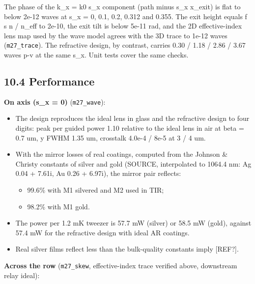 The phase of the k\_x = k0 s\_x component (path minus s\_x x\_exit) is
flat to below 2e-12 waves at s\_x = 0, 0.1, 0.2, 0.312 and 0.355. The
exit height equals f s n / n\_eff to 2e-10, the exit tilt is below 5e-11
rad, and the 2D effective-index lens map used by the wave model agrees
with the 3D trace to 1e-12 waves (\texttt{m27\_trace}). The refractive
design, by contrast, carries 0.30 / 1.18 / 2.86 / 3.67 waves p-v at the
same s\_x. Unit tests cover the same checks.

\hypertarget{104-performance}{%
\subsection{10.4 Performance}\label{collimator-104-performance}}

\textbf{On axis (s\_x = 0)} (\texttt{m27\_wave}):

\begin{itemize}
\tightlist
\item
  The design reproduces the ideal lens in glass and the refractive
  design to four digits: peak per guided power 1.10 relative to the
  ideal lens in air at beta = 0.7 um, y FWHM 1.35 um, crosstalk 4.0e-4 /
  8e-5 at 3 / 4 um.
\item
  With the mirror losses of real coatings, computed from the Johnson \&
  Christy constants of silver and gold (SOURCE, interpolated to 1064.4
  nm: Ag 0.04 + 7.61i, Au 0.26 + 6.97i), the mirror pair reflects:

  \begin{itemize}
  \tightlist
  \item
    99.6\% with M1 silvered and M2 used in TIR;
  \item
    98.2\% with M1 gold.
  \end{itemize}
\item
  The power per 1.2 mK tweezer is 57.7 mW (silver) or 58.5 mW (gold),
  against 57.4 mW for the refractive design with ideal AR coatings.
\item
  Real silver films reflect less than the bulk-quality constants imply
  {[}REF?{]}.
\end{itemize}

\textbf{Across the row} (\texttt{m27\_skew}, effective-index trace
verified above, downstream relay ideal):

